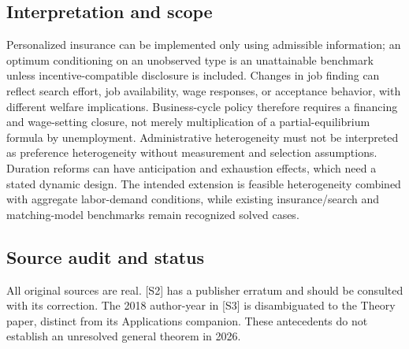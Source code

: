 \documentclass[11pt,a4paper]{article}
\begin{document}
\subsection*{Interpretation and scope}
Personalized insurance can be implemented only using admissible information; an optimum conditioning on an unobserved type is an unattainable benchmark unless incentive-compatible disclosure is included. Changes in job finding can reflect search effort, job availability, wage responses, or acceptance behavior, with different welfare implications. Business-cycle policy therefore requires a financing and wage-setting closure, not merely multiplication of a partial-equilibrium formula by unemployment. Administrative heterogeneity must not be interpreted as preference heterogeneity without measurement and selection assumptions. Duration reforms can have anticipation and exhaustion effects, which need a stated dynamic design. The intended extension is feasible heterogeneity combined with aggregate labor-demand conditions, while existing insurance/search and matching-model benchmarks remain recognized solved cases.

\subsection*{Source audit and status}
All original sources are real. [S2] has a publisher erratum and should be consulted with its correction. The 2018 author-year in [S3] is disambiguated to the Theory paper, distinct from its Applications companion. These antecedents do not establish an unresolved general theorem in 2026.
\end{document}
